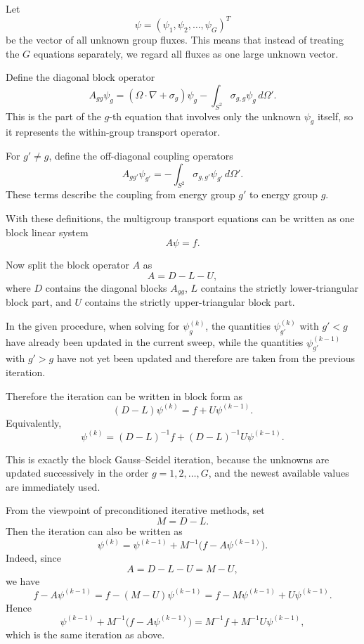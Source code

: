 \documentclass{ctexart}
\begin{document}
\begin{solution}
  Let
  \[
    \psi=(\psi_1,\psi_2,\ldots,\psi_G)^T
  \]
  be the vector of all unknown group fluxes.  This means that instead of
  treating the $G$ equations separately, we regard all fluxes as one large
  unknown vector.

  Define the diagonal block operator
  \[
    A_{gg}\psi_g
    =
    (\Omega\cdot\nabla+\sigma_g)\psi_g
    -
    \int_{S^2}\sigma_{g,g}\psi_g\,d\Omega'.
  \]
  This is the part of the $g$-th equation that involves only the unknown
  $\psi_g$ itself, so it represents the within-group transport operator.

  For $g'\neq g$, define the off-diagonal coupling operators
  \[
    A_{gg'}\psi_{g'}
    =
    -\int_{S^2}\sigma_{g,g'}\psi_{g'}\,d\Omega'.
  \]
  These terms describe the coupling from energy group $g'$ to energy group
  $g$.

  With these definitions, the multigroup transport equations can be written
  as one block linear system
  \[
    A\psi=f.
  \]

  Now split the block operator $A$ as
  \[
    A=D-L-U,
  \]
  where $D$ contains the diagonal blocks $A_{gg}$, $L$ contains the
  strictly lower-triangular block part, and $U$ contains the strictly
  upper-triangular block part.

  In the given procedure, when solving for $\psi_g^{(k)}$, the quantities
  $\psi_{g'}^{(k)}$ with $g'<g$ have already been updated in the current
  sweep, while the quantities $\psi_{g'}^{(k-1)}$ with $g'>g$ have not yet
  been updated and therefore are taken from the previous iteration.

  Therefore the iteration can be written in block form as
  \[
    (D-L)\psi^{(k)}=f+U\psi^{(k-1)}.
  \]
  Equivalently,
  \[
    \psi^{(k)}
    =
    (D-L)^{-1}f
    +
    (D-L)^{-1}U\psi^{(k-1)}.
  \]

  This is exactly the block Gauss--Seidel iteration, because the unknowns
  are updated successively in the order $g=1,2,\ldots,G$, and the newest
  available values are immediately used.

  From the viewpoint of preconditioned iterative methods, set
  \[
    M=D-L.
  \]
  Then the iteration can also be written as
  \[
    \psi^{(k)}
    =
    \psi^{(k-1)}
    +
    M^{-1}\bigl(f-A\psi^{(k-1)}\bigr).
  \]
  Indeed, since
  \[
    A=D-L-U=M-U,
  \]
  we have
  \[
    f-A\psi^{(k-1)}
    =
    f-(M-U)\psi^{(k-1)}
    =
    f-M\psi^{(k-1)}+U\psi^{(k-1)}.
  \]
  Hence
  \[
    \psi^{(k-1)}
    +
    M^{-1}\bigl(f-A\psi^{(k-1)}\bigr)
    =
    M^{-1}f+M^{-1}U\psi^{(k-1)},
  \]
  which is the same iteration as above.


\end{solution}
\end{document}
